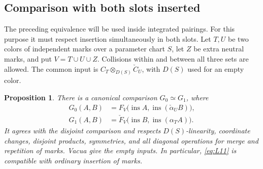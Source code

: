 \documentclass[11pt]{article}
\numberwithin{equation}{section}
\newtheorem{proposition}[theorem]{Proposition}
\theoremstyle{definition}
\theoremstyle{remark}
\begin{document}
\subsection{Comparison with both slots inserted}

The preceding equivalence will be used inside integrated pairings.
For this purpose it must respect insertion simultaneously in both
slots.  Let $T,U$ be two colors of independent marks over a parameter
chart $S$, let $Z$ be extra neutral marks, and put
$V=T\cup U\cup Z$.  Collisions within and between all three sets
are allowed.  The common input is
$C_T\otimes_{D(S)}\check C_U$, with $D(S)$ used for an empty color.

\begin{proposition}\label{local:two-slot}
There is a canonical comparison $G_0\simeq G_1$, where
\begin{equation}\label{eq:L12}
 \begin{aligned}
 G_0(A,B)&=F_V\bigl(\operatorname{ins}A,
                   \operatorname{ins}(\check\alpha_U B)\bigr),\\
 G_1(A,B)&=\check F_V\bigl(\operatorname{ins}B,
                   \operatorname{ins}(\alpha_T A)\bigr).
 \end{aligned}
\end{equation}
It agrees with the disjoint comparison and respects $D(S)$-linearity,
coordinate changes, disjoint products, symmetries, and all diagonal
operations for merge and repetition of marks.  Vacua give the empty
inputs.  In particular, \eqref{eq:L11} is compatible with ordinary
insertion of marks.
\end{proposition}
\end{document}
